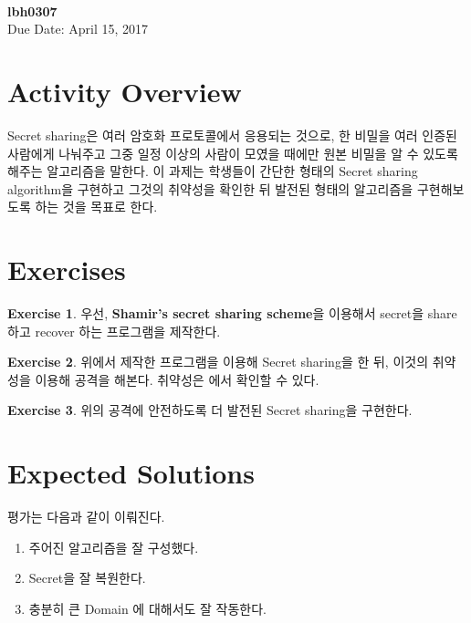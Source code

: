 \documentclass[a4paper, 11pt]{article}
\theoremstyle{definition}
\newtheorem{exercise}{Exercise}
\begin{document}
 \\
         {\phantom{} \hfill \textbf{lbh0307}} \\
         {\phantom{} \hfill Due Date: April 15, 2017} \\

\section{Activity Overview}

Secret sharing은 여러 암호화 프로토콜에서 응용되는 것으로, 한 비밀을 여러 인증된
사람에게 나눠주고 그중 일정 이상의 사람이 모였을 때에만 원본 비밀을 알 수 있도록
해주는 알고리즘을 말한다. 이 과제는 학생들이 간단한 형태의 Secret sharing
algorithm을 구현하고 그것의 취약성을 확인한 뒤 발전된 형태의 알고리즘을 구현해보도록
하는 것을 목표로 한다.

\section{Exercises}

\begin{exercise}

  우선, \textbf{Shamir's secret sharing scheme}\cite{SecShareShamir}을 이용해서
  secret을 share하고 recover 하는 프로그램을 제작한다.

\end{exercise}

\begin{exercise}

  위에서 제작한 프로그램을 이용해 Secret sharing을 한 뒤, 이것의 취약성을 이용해
  공격을 해본다. 취약성은 \cite{SecShareShamir}에서 확인할 수 있다.

\end{exercise}

\begin{exercise}

  위의 공격에 안전하도록 더 발전된 Secret sharing\cite{BetterSecShare}을 구현한다.

\end{exercise}

\section{Expected Solutions}

평가는 다음과 같이 이뤄진다.
\begin{enumerate}
  \item 주어진 알고리즘을 잘 구성했다.
  \item Secret을 잘 복원한다.
  \item 충분히 큰 Domain 에 대해서도 잘 작동한다.
\end{enumerate}



\end{document}
